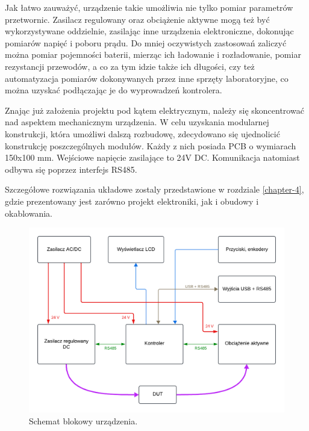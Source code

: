 Jak łatwo zauważyć, urządzenie takie umożliwia nie tylko pomiar parametrów przetwornic. Zasilacz regulowany oraz obciążenie aktywne mogą też być wykorzystywane oddzielnie,
zasilając inne urządzenia elektroniczne, dokonując pomiarów napięć i poboru prądu. 
Do mniej oczywistych zastosowań zaliczyć można pomiar pojemności baterii, mierząc ich ładowanie i rozładowanie, pomiar rezystancji przewodów, a co za tym idzie także ich długości, czy też automatyzacja pomiarów dokonywanych przez
inne sprzęty laboratoryjne, co można uzyskać podłączając je do wyprowadzeń kontrolera.

Znając już założenia projektu pod kątem elektrycznym, należy się skoncentrować nad aspektem mechanicznym urządzenia.
W celu uzyskania modularnej konstrukcji, która umożliwi dalszą rozbudowę, zdecydowano się ujednolicić konstrukcję poszczególnych modułów. 
Każdy z nich posiada PCB o wymiarach 150x100 mm. Wejściowe napięcie zasilające to 24V DC. Komunikacja natomiast odbywa się poprzez interfejs RS485. 

Szczegółowe rozwiązania układowe zostaly przedstawione w rozdziale \ref{chapter-4}, gdzie prezentowany jest zarówno projekt elektroniki, jak i obudowy i okablowania.

\begin{figure}[h!]
    \begin{center}
        \includegraphics[width = 17cm]{images/schemat_blokowy.png}
        \caption{Schemat blokowy urządzenia.}
        \label{fig:schematBlokowy}
    \end{center}
\end{figure}








